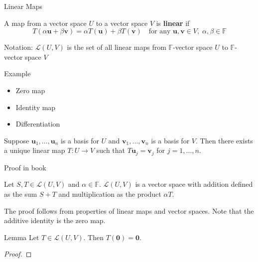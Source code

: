 \documentclass [aspectratio=169]{beamer}
\newcommand{\bu}{{\mathbf{u}}}
\newcommand{\bv}{{\mathbf{v}}}
\newcommand{\zerovec}{{\mathbf{0}}}
\newcommand{\F}{{\mathbb{F}}}
\newcommand{\cL}{{\mathcal{L}}}
\begin{document}
\begin{frame}{Linear Maps}
\begin{definition}
A map from a vector space $U$ to a vector space $V$ is \textbf{linear} if
\begin{equation*}
    T(\alpha \bu + \beta \bv) = \alpha T(\bu) + \beta T(\bv) \quad \text{for any } \bu, \bv \in V, \; \alpha, \beta \in \F
\end{equation*}
\end{definition}

\vspace{1em}

Notation: $\mathcal{L}(U,V)$ is the set of all linear maps from $\F$-vector space $U$ to $\F$-vector space $V$

\end{frame}


\begin{frame}
\begin{exampleblock}{Example}

\begin{itemize}
\setlength\itemsep{3em}
\item Zero map
\item Identity map
\item Differentiation
\end{itemize}
\vspace{6em}
\end{exampleblock}
\end{frame}


\begin{frame}
\begin{theorem}
Suppose $\bu_1, \ldots, \bu_n$ is a basis for $U$ and $\bv_1, \ldots, \bv_n$ is a basis for $V$. Then there exists a unique linear map $T:U \to V$ such that $T \bu_j = \bv_j$ for $j=1,\ldots, n$.
\end{theorem}

Proof in book

\begin{theorem}
Let $S,T \in \mathcal{L}(U,V)$ and $\alpha \in \F$. $\mathcal{L}(U,V)$ is a vector space with addition defined as the sum $S+T$ and multiplication as the product $\alpha T$.
\end{theorem}

The proof follows from properties of linear maps and vector spaces. Note that the additive identity is the zero map.
\end{frame}

\begin{frame}
\begin{alertblock}{Lemma}
Let $T \in \cL(U,V)$. Then $T(\zerovec) = \zerovec$.
\end{alertblock}

\vspace{0.5em}

\begin{proof}
\vspace{3cm}
\end{proof}

\end{frame}
\end{document}

